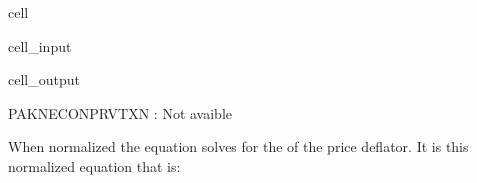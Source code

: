 \documentclass[letterpaper,10pt,english]{jupyterBook}
\begin{document}
\begin{sphinxuseclass}{cell}\begin{sphinxVerbatimInput}

\begin{sphinxuseclass}{cell_input}
\begin{sphinxVerbatim}[commandchars=\\\{\}]
\PYG{p}{[}\PYG{p}{]}
\end{sphinxVerbatim}

\end{sphinxuseclass}\end{sphinxVerbatimInput}
\begin{sphinxVerbatimOutput}

\begin{sphinxuseclass}{cell_output}
\begin{sphinxVerbatim}[commandchars=\\\{\}]
PAKNECONPRVTXN : Not avaible
\end{sphinxVerbatim}

\end{sphinxuseclass}\end{sphinxVerbatimOutput}

\end{sphinxuseclass}
\sphinxAtStartPar
When normalized the equation solves for the  of the price deflator.  It is this normalized equation that is:
\end{document}
